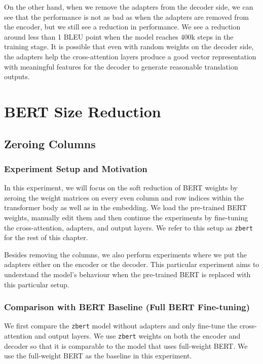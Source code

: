 On the other hand, when we remove the adapters from the decoder side, we can see that the performance is not as bad as when the adapters are removed from the encoder, but we still see a reduction in performance. We see a reduction around less than 1 BLEU point when the model reaches 400k steps in the training stage. It is possible that even with random weights on the decoder side, the adapters help the cross-attention layers produce a good vector representation with meaningful features for the decoder to generate reasonable translation outputs.

\section{BERT Size Reduction}
\subsection{Zeroing Columns}
\subsubsection{Experiment Setup and Motivation}
In this experiment, we will focus on the soft reduction of BERT weights by zeroing the weight matrices on every even column and row indices within the transformer body as well as in the embedding. We load the pre-trained BERT weights, manually edit them and then continue the experiments by fine-tuning the cross-attention, adapters, and output layers. We refer to this setup as \texttt{zbert} for the rest of this chapter.

Besides removing the columns, we also perform experiments where we put the adapters either on the encoder or the decoder. This particular experiment aims to understand the model's behaviour when the pre-trained BERT is replaced with this particular setup.

\subsubsection{Comparison with BERT Baseline (Full BERT Fine-tuning)}
We first compare the \texttt{zbert} model without adapters and only fine-tune the cross-attention and output layers. We use \texttt{zbert} weights on both the encoder and decoder so that it is comparable to the model that uses full-weight BERT. We use the full-weight BERT as the baseline in this experiment.

